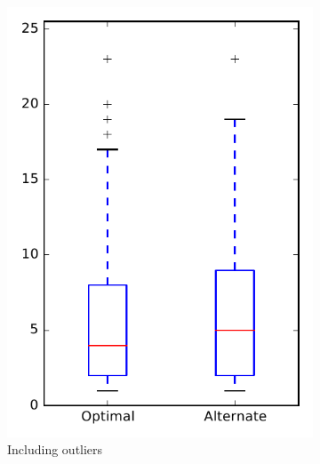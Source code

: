 
\begin{figure}
    \centering
    \begin{subfigure}{.4\textwidth}
        \centering
        \includegraphics[height=0.4\textheight]{figures/combo/dit_rq1_openjpa}
        \caption{Including outliers}\label{fig:combo:dit:rq1:openjpa_outlier}
    \end{subfigure}%
    \begin{subfigure}{.4\textwidth}
        \centering

\end{subfigure}
\end{figure}
